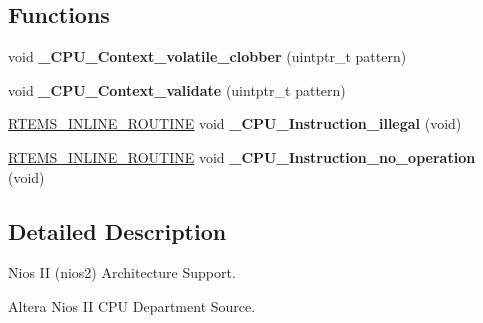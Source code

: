 \subsection*{Functions}
\begin{DoxyCompactItemize}
\item 
\mbox{\label{group__RTEMSScoreCPUnios2_gad26becade17fbdbb0bdf63c6b9228688}} 
void {\bfseries \+\_\+\+C\+P\+U\+\_\+\+Context\+\_\+volatile\+\_\+clobber} (uintptr\+\_\+t pattern)
\item 
\mbox{\label{group__RTEMSScoreCPUnios2_ga3adb94b8d32fd0e3058934ffd3df6d90}} 
void {\bfseries \+\_\+\+C\+P\+U\+\_\+\+Context\+\_\+validate} (uintptr\+\_\+t pattern)
\item 
\mbox{\label{group__RTEMSScoreCPUnios2_ga07618c93359f2485af2e98a96b330208}} 
\mbox{\hyperlink{group__RTEMSScoreBaseDefs_gac216239df231d5dbd15e3520b0b9313f}{R\+T\+E\+M\+S\+\_\+\+I\+N\+L\+I\+N\+E\+\_\+\+R\+O\+U\+T\+I\+NE}} void {\bfseries \+\_\+\+C\+P\+U\+\_\+\+Instruction\+\_\+illegal} (void)
\item 
\mbox{\label{group__RTEMSScoreCPUnios2_gab683a0a37a089e2a0fd3c356836d5499}} 
\mbox{\hyperlink{group__RTEMSScoreBaseDefs_gac216239df231d5dbd15e3520b0b9313f}{R\+T\+E\+M\+S\+\_\+\+I\+N\+L\+I\+N\+E\+\_\+\+R\+O\+U\+T\+I\+NE}} void {\bfseries \+\_\+\+C\+P\+U\+\_\+\+Instruction\+\_\+no\+\_\+operation} (void)
\end{DoxyCompactItemize}


\subsection{Detailed Description}
Nios II (nios2) Architecture Support. 

Altera Nios II C\+PU Department Source.